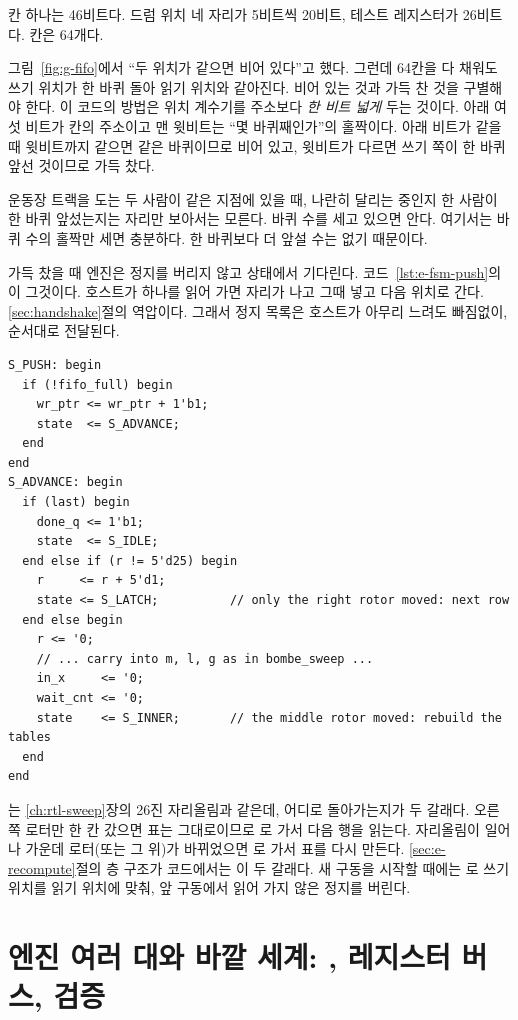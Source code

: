 칸 하나는 46비트다. 드럼 위치 네 자리가 5비트씩 20비트, 테스트 레지스터가 26비트다. 칸은 64개다.

\Why 그림~\ref{fig:g-fifo}에서 ``두 위치가 같으면 비어 있다''고 했다. 그런데 64칸을 다 채워도 쓰기 위치가
한 바퀴 돌아 읽기 위치와 같아진다. 비어 있는 것과 가득 찬 것을 구별해야 한다. 이 코드의 방법은 위치
계수기를 주소보다 \emph{한 비트 넓게} 두는 것이다. 아래 여섯 비트가 칸의 주소이고 맨 윗비트는 ``몇 바퀴째인가''의
홀짝이다. 아래 비트가 같을 때 윗비트까지 같으면 같은 바퀴이므로 비어 있고, 윗비트가 다르면 쓰기 쪽이 한
바퀴 앞선 것이므로 가득 찼다.

\General 운동장 트랙을 도는 두 사람이 같은 지점에 있을 때, 나란히 달리는 중인지 한 사람이 한 바퀴 앞섰는지는
자리만 보아서는 모른다. 바퀴 수를 세고 있으면 안다. 여기서는 바퀴 수의 홀짝만 세면 충분하다. 한 바퀴보다
더 앞설 수는 없기 때문이다.

\Ours 가득 찼을 때 엔진은 정지를 버리지 않고  상태에서 기다린다. 코드~\ref{lst:e-fsm-push}의
이 그것이다. 호스트가 하나를 읽어 가면 자리가 나고 그때 넣고 다음 위치로 간다.
\ref{sec:handshake}절의 역압이다. 그래서 정지 목록은 호스트가 아무리 느려도 빠짐없이, 순서대로 전달된다.

\begin{lstlisting}[language=SV,caption={\code{bombe\_engine.sv}: \code{PUSH}와 \code{ADVANCE}.},label={lst:e-fsm-push}]
S_PUSH: begin
  if (!fifo_full) begin
    wr_ptr <= wr_ptr + 1'b1;
    state  <= S_ADVANCE;
  end
end
S_ADVANCE: begin
  if (last) begin
    done_q <= 1'b1;
    state  <= S_IDLE;
  end else if (r != 5'd25) begin
    r     <= r + 5'd1;
    state <= S_LATCH;          // only the right rotor moved: next row
  end else begin
    r <= '0;
    // ... carry into m, l, g as in bombe_sweep ...
    in_x     <= '0;
    wait_cnt <= '0;
    state    <= S_INNER;       // the middle rotor moved: rebuild the tables
  end
end
\end{lstlisting}

는 \ref{ch:rtl-sweep}장의 26진 자리올림과 같은데, 어디로 돌아가는지가 두 갈래다. 오른쪽
로터만 한 칸 갔으면 표는 그대로이므로 로 가서 다음 행을 읽는다. 자리올림이 일어나 가운데
로터(또는 그 위)가 바뀌었으면 로 가서 표를 다시 만든다. \ref{sec:e-recompute}절의 층 구조가
코드에서는 이 두 갈래다. 새 구동을 시작할 때에는 로 쓰기 위치를 읽기 위치에 맞춰,
앞 구동에서 읽어 가지 않은 정지를 버린다.

\chapter{엔진 여러 대와 바깥 세계: \texorpdfstring{}{bombe\_array}, 레지스터 버스, 검증}\label{ch:fpga-array}

